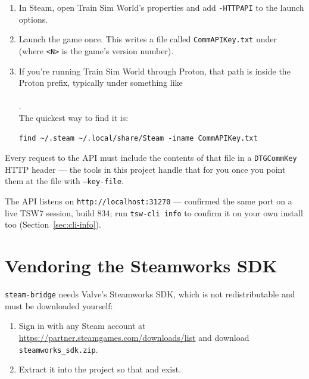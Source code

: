 \documentclass[11pt,a4paper]{article}
\newcommand{\code}[1]{\texttt{#1}}
\begin{document}
\begin{enumerate}[leftmargin=1.5em]
    \item In Steam, open Train Sim World's properties and add
    \code{-HTTPAPI} to the launch options.
    \item Launch the game once. This writes a file called
    \code{CommAPIKey.txt} under\\
     (where
    \code{<N>} is the game's version number).
    \item If you're running Train Sim World through Proton, that path is
    inside the Proton prefix, typically under something like\\
     \\
    . \\
    The quickest way to find it is:
\begin{lstlisting}
find ~/.steam ~/.local/share/Steam -iname CommAPIKey.txt
\end{lstlisting}
\end{enumerate}

Every request to the API must include the contents of that file in a
\code{DTGCommKey} HTTP header --- the tools in this project handle that for
you once you point them at the file with \code{--key-file}.

The API listens on \code{http://localhost:31270} --- confirmed the same
port on a live TSW7 session, build 834; run \code{tsw-cli info} to confirm
it on your own install too (Section~\ref{sec:cli-info}).

\section{Vendoring the Steamworks SDK}
\label{sec:sdk}

\code{steam-bridge} needs Valve's Steamworks SDK, which is not
redistributable and must be downloaded yourself:

\begin{enumerate}[leftmargin=1.5em]
    \item Sign in with any Steam account at
    \url{https://partner.steamgames.com/downloads/list} and download
    \code{steamworks\_sdk.zip}.
    \item Extract it into the project so that
     and
     exist.
\end{enumerate}
\end{document}
